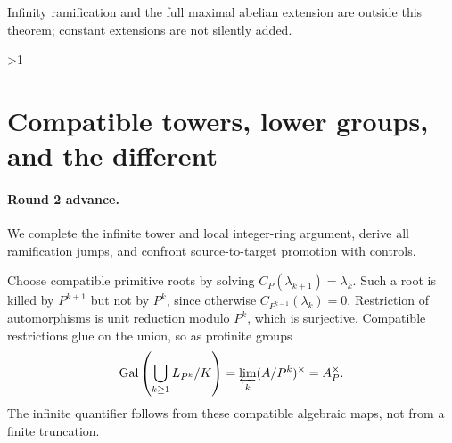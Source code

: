 \documentclass[10pt]{article}
\newcommand{\Gal}{\operatorname{Gal}}
\begin{document}
Infinity ramification and the full maximal abelian extension are outside
this theorem; constant extensions are not silently added.
\fi

\ifnum\CRevisionRound>1
\section{Compatible towers, lower groups, and the different}
\paragraph{Round 2 advance.}
We complete the infinite tower and local integer-ring argument, derive all
ramification jumps, and confront source-to-target promotion with controls.

Choose compatible primitive roots by solving $C_P(\lambda_{k+1})=\lambda_k$.
Such a root is killed by $P^{k+1}$ but not by $P^k$, since otherwise
$C_{P^{k-1}}(\lambda_k)=0$. Restriction of automorphisms is unit reduction
modulo $P^k$, which is surjective. Compatible restrictions glue on the union,
so as profinite groups
\[
 \Gal\left(\bigcup_{k\geq1}L_{P^k}/K\right)
 =\varprojlim_k(A/P^k)^\times=A_P^\times.
\]
The infinite quantifier follows from these compatible algebraic maps,
not from a finite truncation.
\end{document}
